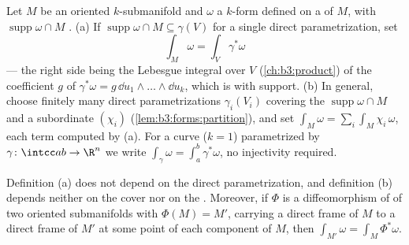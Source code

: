 \begin{definition}\label{def:b3:forms:integral}
Let $M$ be an oriented $k$-submanifold and $\omega$ a
$k$-form defined on a  of $M$, with
$\operatorname{supp}\omega \cap M$ .
(a) If $\operatorname{supp}\omega \cap M \subseteq
\gamma(V)$ for a single direct parametrization, set
\[
\int_M\omega = \int_V\gamma^*\omega
\]
--- the right side being the Lebesgue integral over $V$
(\cref{ch:b3:product}) of the coefficient $g$ of
$\gamma^*\omega = g\,\dd u_1\wedge\dots\wedge\dd u_k$, which
is  with  support.
(b) In general, choose finitely many direct parametrizations
$\gamma_i(V_i)$ covering the 
$\operatorname{supp}\omega \cap M$ and a subordinate
 $(\chi_i)$
(\cref{lem:b3:forms:partition}), and set $\int_M\omega =
\sum_i\int_M\chi_i\,\omega$, each term computed by (a).
For a curve ($k = 1$) parametrized by
$\gamma\colon\intcc ab\to\R^n$ we write
$\int_\gamma\omega = \int_a^b\gamma^*\omega$, no injectivity
required.
\end{definition}

\begin{lemma}[Consistency]\label{lem:b3:forms:consistency}
Definition (a) does not depend on the direct
parametrization, and definition (b) depends neither on the
cover nor on the . Moreover, if
$\Phi$ is a diffeomorphism of  of two oriented
submanifolds with $\Phi(M) = M'$, carrying a direct frame of
$M$ to a direct frame of $M'$ at some point of each
component of $M$, then $\int_{M'}\omega =
\int_M\Phi^*\omega$.
\end{lemma}


